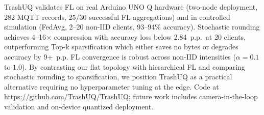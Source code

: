 TrashUQ validates FL on real Arduino UNO Q hardware (two-node deployment, 282 MQTT records, 25/30 successful FL aggregations) and in controlled simulation (FedAvg, 2--20 non-IID clients, 93--94\% accuracy). Stochastic rounding achieves 4--16$\times$ compression with accuracy loss below 2.84~p.p.\ at 20 clients, outperforming Top-k sparsification which either saves no bytes or degrades accuracy by 9+~p.p. FL convergence is robust across non-IID intensities ($\alpha=0.1$ to $1.0$). By contrasting our flat topology with hierarchical FL and comparing stochastic rounding to sparsification, we position TrashUQ as a practical alternative requiring no hyperparameter tuning at the edge. Code at \url{https://github.com/TrashUQ/TrashUQ}; future work includes camera-in-the-loop validation and on-device quantized deployment.
